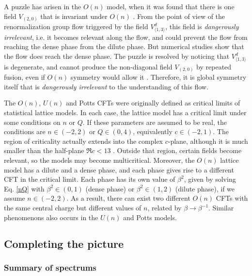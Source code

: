 \documentclass[12pt, a4paper]{article}
\theoremstyle{break}
\begin{document}
A puzzle has arisen in the $O(n)$ model, when it was found that there is one field $V_{(2,0)}$ that is invariant under $O(n)$ \cite{gz20}. From the point of view of the renormalization group flow triggered by the field $V^d_{\langle 1,3\rangle}$, this field is \textit{dangerously irrelevant}, i.e. it becomes relevant along the flow, and could prevent the flow from reaching the dense phase from the dilute phase. But numerical studies show that the flow does reach the dense phase. The puzzle is resolved by noticing that $V^d_{\langle 1,3\rangle}$ is degenerate, and cannot produce the non-diagonal field $V_{(2,0)}$ by repeated fusion, even if $O(n)$ symmetry would allow it \cite{js23}. Therefore, it is global symmetry itself that is \textit{dangerously irrelevant} to the understanding of this flow. 

The $O(n)$, $U(n)$ and Potts CFTs were originally defined as critical limits of statistical lattice models. In each case, the lattice model has a critical limit under some conditions on $n$ or $Q$. If these parameters are assumed to be real, the conditions are $n\in (-2,2)$ or $Q\in (0,4)$, equivalently $c\in (-2,1)$. The region of criticality actually extends into the complex $c$-plane, although it is much smaller than the half-plane $\Re c<13$ \cite{bjjz22}. Outside that region, certain fields become relevant, so the models may become multicritical. Moreover, the $O(n)$ lattice model has a dilute and a dense phase, and each phase gives rise to a different CFT in the critical limit. Each phase has its own value of $\beta^2$, given by solving Eq. \eqref{nQ} with $\beta^2\in (0,1)$ (dense phase) or $\beta^2\in (1,2)$ (dilute phase), if we assume $n\in (-2,2)$. 
As a result, there can exist two different $O(n)$ CFTs with the same central charge but different values of $n$, related by $\beta \to\beta^{-1}$. Similar phenomenons also occurs in the $U(n)$ and Potts models.

\subsection{Completing the picture}

\subsubsection{Summary of spectrums}
\end{document}
